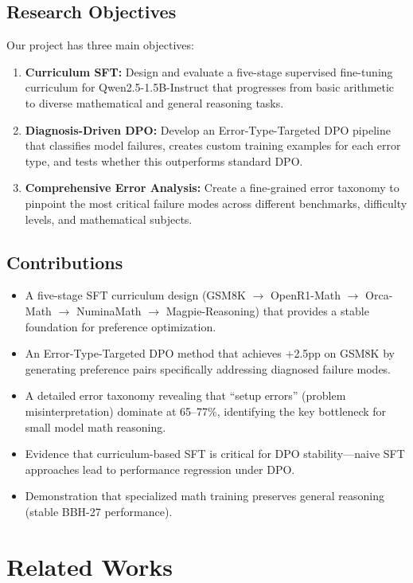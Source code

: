 \documentclass{article}
\begin{document}
\subsection{Research Objectives}
Our project has three main objectives:
\begin{enumerate}[noitemsep]
    \item \textbf{Curriculum SFT:} Design and evaluate a five-stage supervised fine-tuning curriculum for Qwen2.5-1.5B-Instruct that progresses from basic arithmetic to diverse mathematical and general reasoning tasks.
    \item \textbf{Diagnosis-Driven DPO:} Develop an Error-Type-Targeted DPO pipeline that classifies model failures, creates custom training examples for each error type, and tests whether this outperforms standard DPO.
    \item \textbf{Comprehensive Error Analysis:} Create a fine-grained error taxonomy to pinpoint the most critical failure modes across different benchmarks, difficulty levels, and mathematical subjects.
\end{enumerate}

\subsection{Contributions}
\begin{itemize}[noitemsep]
    \item A five-stage SFT curriculum design (GSM8K $\to$ OpenR1-Math $\to$ Orca-Math $\to$ NuminaMath $\to$ Magpie-Reasoning) that provides a stable foundation for preference optimization.
    \item An Error-Type-Targeted DPO method that achieves +2.5pp on GSM8K by generating preference pairs specifically addressing diagnosed failure modes.
    \item A detailed error taxonomy revealing that ``setup errors'' (problem misinterpretation) dominate at 65--77\%, identifying the key bottleneck for small model math reasoning.
    \item Evidence that curriculum-based SFT is critical for DPO stability---naive SFT approaches lead to performance regression under DPO.
    \item Demonstration that specialized math training preserves general reasoning (stable BBH-27 performance).
\end{itemize}

\section{Related Works}
\end{document}
